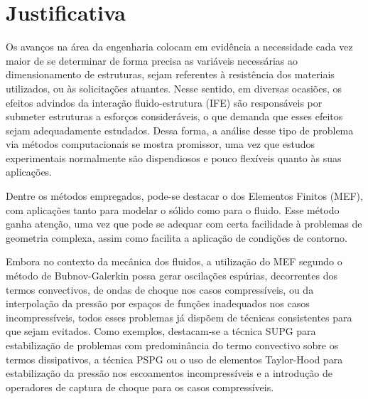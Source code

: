 


\section{Justificativa}

Os avanços na área da engenharia colocam em evidência a necessidade cada vez maior de se determinar de forma precisa as variáveis necessárias ao dimensionamento de estruturas, sejam referentes à resistência dos materiais utilizados, ou às solicitações atuantes. Nesse sentido, em diversas ocasiões, os efeitos advindos da interação fluido-estrutura (IFE) são responsáveis por submeter estruturas a esforços consideráveis, o que demanda que esses efeitos sejam adequadamente estudados. Dessa forma, a análise desse tipo de problema via métodos computacionais se mostra promissor, uma vez que estudos experimentais normalmente são dispendiosos e pouco flexíveis quanto às suas aplicações.

Dentre os métodos empregados, pode-se destacar o dos Elementos Finitos (MEF), com aplicações tanto para modelar o sólido como para o fluido. Esse método ganha atenção, uma vez que pode se adequar com certa facilidade à problemas de geometria complexa, assim como facilita a aplicação de condições de contorno.

Embora no contexto da mecânica dos fluidos, a utilização do MEF segundo o método de Bubnov-Galerkin possa gerar oscilações espúrias, decorrentes dos termos convectivos, de ondas de choque nos casos compressíveis, ou da interpolação da pressão por espaços de funções inadequados nos casos incompressíveis, todos esses problemas já dispõem de técnicas consistentes para que sejam evitados. Como exemplos, destacam-se a técnica SUPG para estabilização de problemas com predominância do termo convectivo sobre os termos dissipativos, a técnica PSPG ou o uso de elementos Taylor-Hood para estabilização da pressão nos escoamentos incompressíveis e a introdução de operadores de captura de choque para os casos compressíveis.

